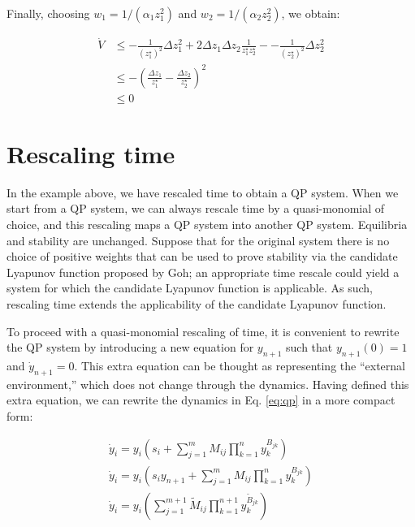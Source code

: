 \documentclass{article}
\begin{document}
Finally, choosing \(w_1 = 1 / (\alpha_1 z_1^2)\) and
\(w_2 = 1 / (\alpha_2 z_2^2)\), we obtain:

\begin{equation}
\begin{aligned}
\dot{V} &\leq -\frac{1}{(z_1^\star)^2} \Delta z_1^2 + 2 \Delta z_1 \Delta z_2 \frac{1}{z_1^\star z_2^\star} - -\frac{1}{(z_2^\star)^2} \Delta z_2^2 \\
&\leq - \left(\frac{\Delta z_1}{z_1^\star} - \frac{\Delta z_2}{z_2^\star}\right)^2 \\
&\leq 0
\end{aligned}
\end{equation}

\hypertarget{rescaling-time}{%
\section{Rescaling time}\label{rescaling-time}}

In the example above, we have rescaled time to obtain a QP system. When
we start from a QP system, we can always rescale time by a
quasi-monomial of choice, and this rescaling maps a QP system into
another QP system. Equilibria and stability are unchanged. Suppose that
for the original system there is no choice of positive weights that can
be used to prove stability via the candidate Lyapunov function proposed
by Goh; an appropriate time rescale could yield a system for which the
candidate Lyapunov function is applicable. As such, rescaling time
extends the applicability of the candidate Lyapunov function.

To proceed with a quasi-monomial rescaling of time, it is convenient to
rewrite the QP system by introducing a new equation for \(y_{n+1}\) such
that \(y_{n+1}(0) = 1\) and \(\dot{y}_{n+1} = 0\). This extra equation
can be thought as representing the ``external environment,'' which does
not change through the dynamics. Having defined this extra equation, we
can rewrite the dynamics in Eq. \ref{eq:qp} in a more compact form:

\begin{equation}
\label{eq:qpextra}
\begin{aligned}
\dot{y}_i = y_i \left( s_i + \sum_{j = 1}^m M_{ij} \prod_{k = 1}^n y_k^{B_{jk}} \right)\\
\dot{y}_i = y_i \left( s_i y_{n+1} + \sum_{j = 1}^m M_{ij} \prod_{k = 1}^n y_k^{B_{jk}} \right)\\
\dot{y}_i = y_i \left(\sum_{j = 1}^{m+1} \tilde{M}_{ij} \prod_{k = 1}^{n+1} y_k^{\tilde{B}_{jk}} \right)
\end{aligned}
\end{equation}
\end{document}
